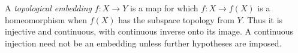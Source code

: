 
A \emph{topological embedding} $f:X\to Y$ is a map for which $f:X\to f(X)$ is a homeomorphism when $f(X)$ has the subspace topology from $Y$. Thus it is injective and continuous, with continuous inverse onto its image. A continuous injection need not be an embedding unless further hypotheses are imposed.
